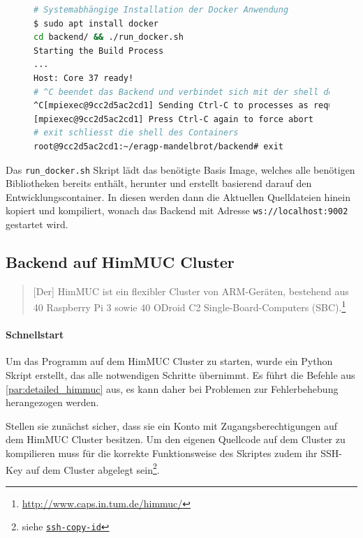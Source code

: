 \begin{figure}[h!]
	\begin{lstlisting}[language=bash, caption={Starten der Entwicklungsumbegung des Backends}]
# Systemabhängige Installation der Docker Anwendung
$ sudo apt install docker
cd backend/ && ./run_docker.sh
Starting the Build Process
...
Host: Core 37 ready!
# ^C beendet das Backend und verbindet sich mit der shell des Containers
^C[mpiexec@9cc2d5ac2cd1] Sending Ctrl-C to processes as requested
[mpiexec@9cc2d5ac2cd1] Press Ctrl-C again to force abort
# exit schliesst die shell des Containers
root@9cc2d5ac2cd1:~/eragp-mandelbrot/backend# exit
        \end{lstlisting}
\end{figure}

Das \verb|run_docker.sh| Skript lädt das benötigte Basis Image, welches alle benötigen Bibliotheken bereits enthält, herunter und erstellt basierend darauf
den Entwicklungscontainer. In diesen werden dann die Aktuellen Quelldateien hinein kopiert und kompiliert, wonach das Backend mit Adresse
\verb|ws://localhost:9002| gestartet wird.

\subsection{Backend auf HimMUC Cluster}

\begin{quotation}
	[Der] HimMUC ist ein flexibler Cluster von ARM-Geräten, bestehend aus 40 Raspberry Pi 3 sowie 40 ODroid C2 Single-Board-Computers (SBC).\footnote{\url{http://www.caps.in.tum.de/himmuc/}}
\end{quotation}

\paragraph{Schnellstart}

Um das Programm auf dem HimMUC Cluster zu starten, wurde ein
Python Skript erstellt, das alle notwendigen Schritte übernimmt.
Es führt die Befehle aus \autoref{par:detailed_himmuc} aus, es kann daher bei Problemen zur Fehlerbehebung herangezogen werden.

Stellen sie zunächst sicher, dass sie ein Konto mit Zugangsberechtigungen auf dem HimMUC Cluster besitzen.
Um den eigenen Quellcode auf dem Cluster zu kompilieren muss für die korrekte Funktionsweise des Skriptes zudem
ihr SSH-Key auf dem Cluster abgelegt sein\footnote{siehe \href{https://www.ssh.com/ssh/copy-id}{\texttt{ssh-copy-id}}}.

